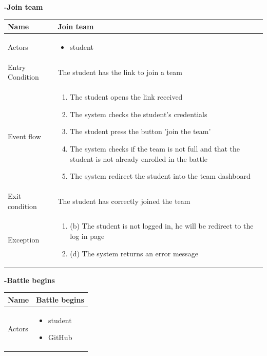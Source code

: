 \begin{enumerate}[label=\textbf{[UC\arabic*]}]
\item  \textbf{-Join team}
    \\ \begin{tabular}{|l|p{11cm}|}
        \hline
        Name & Join team  \\
        \hline
        Actors & \begin{itemize}
                    \item student
                \end{itemize} \\
        \hline
        Entry Condition & The student has the link to join a team\\
        \hline
        Event flow & \begin{enumerate}
            \item The student opens the link received
            \item The system checks the student's credentials
            \item The student press the button 'join the team'
            \item The system checks if the team is not full and that the student is not already enrolled in the battle
            \item The system redirect the student into the team dashboard
        \end{enumerate}\\
        \hline
        Exit condition &   The student has correctly joined the team \\
        \hline
        Exception & \begin{enumerate} [label={}, leftmargin=0.25cm ]
            \item (b) The student is not logged in, he will be redirect to the log in page
            \item (d) The system returns an error message
        \end{enumerate}\\ 
        \hline            
    \end{tabular}
\newpage
    \item  \textbf{-Battle begins}
    \\ \begin{tabular}{|l|p{11cm}|}
        \hline
        Name & Battle begins \\
        \hline
        Actors & \begin{itemize} 
                    \item student
                    \item GitHub

\end{itemize}
\end{tabular}
\end{enumerate}
